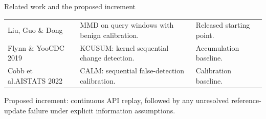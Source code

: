 \begin{frame}[t]{Related work and the proposed increment}
\vspace{0.2cm}
\renewcommand{\arraystretch}{1.4}
{\small
\begin{tabularx}{\textwidth}{@{}L{3.4cm}L{5.0cm}Y@{}}
\toprule
{} &  & \\
\midrule
Liu, Guo \& Dong &
MMD on query windows with benign calibration. &
Released starting point.\\
Flynn \& Yoo\newline CDC 2019 &
KCUSUM: kernel sequential change detection. &
Accumulation baseline.\\
Cobb et al.\newline AISTATS 2022 &
CALM: sequential false-detection calibration. &
Calibration baseline.\\
\bottomrule
\end{tabularx}\par}
\vspace{0.45cm}
{\small Proposed increment: continuous API replay, followed by any unresolved reference-update failure under explicit information assumptions.\par}
\end{frame}

